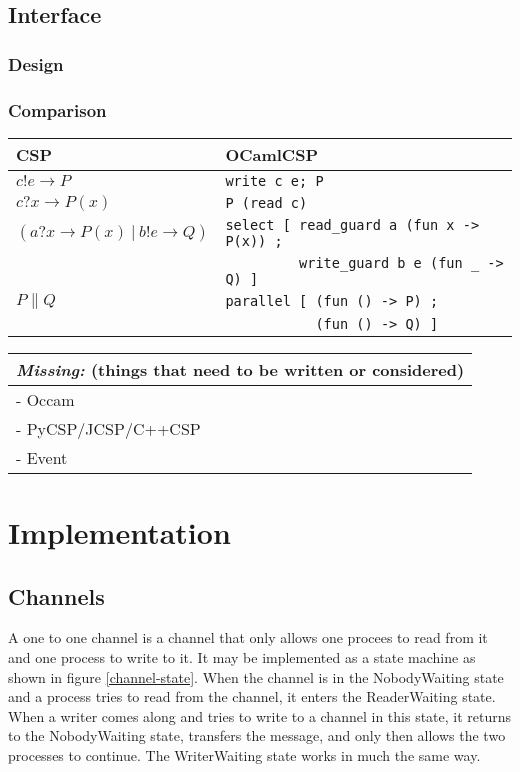 \documentclass[a4paper,12pt]{article}
\newcommand{\missing}[1]{
\begin{tabular}{|p{11cm}|}
\hline
\emph{Missing:} {\scriptsize (things that need to be written or considered)} \\
\hline
#1
\hline
\end{tabular}
}
\begin{document}
\subsection{Interface}

\subsubsection{Design}

\subsubsection{Comparison}

\begin{tabular}{l|l}
CSP & OCamlCSP \\
\hline
$c!e \to P$ & \texttt{write c e; P} \\
\hline
$c?x \to P(x)$ & \texttt{P (read c)} \\
\hline
$(a?x \to P(x)\ |\ b!e \to Q)$ 
&\verb|select [ read_guard a (fun x -> P(x)) ;| \\
&\verb|         write_guard b e (fun _ -> Q) ]|\\
\hline
$P \parallel Q$ 
&\verb|parallel [ (fun () -> P) ;| \\
&\verb|           (fun () -> Q) ]| \\
\end{tabular}

\missing{
- Occam \\
- PyCSP/JCSP/C++CSP \\
- Event \\
}


\section{Implementation}
\label{implementation}


\subsection{Channels}
A one to one channel is a channel that only allows one procees to read from it and one process 
to write to it. It may be implemented as a state machine as shown in figure \ref{channel-state}.
When the channel is in the NobodyWaiting state and a process tries to read from the channel,
it enters the ReaderWaiting state. When a writer comes along and tries to write to a channel
in this state, it returns to the NobodyWaiting state, transfers the message, and only then
allows the two processes to continue. The WriterWaiting state works in much the same way.
\end{document}
